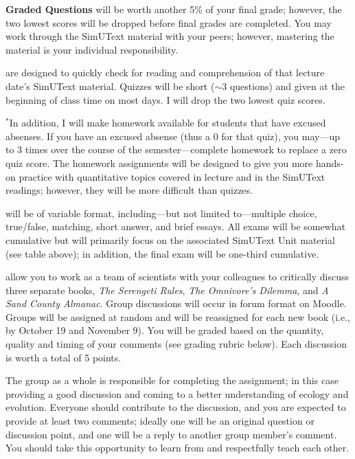\documentclass{tufte-handout}
\begin{document}
\textbf{Graded Questions} will be worth another 5\% of your final grade; however, the two lowest scores will be dropped before final grades are completed. You may work through the SimUText material with your peers; however, mastering the material is your individual responsibility.



\begin{fullwidth}	

 are designed to quickly check for reading and comprehension of that lecture date's SimUText material. Quizzes will be short ($\sim$3 questions) and given at the beginning of class time on most days. I will drop the two lowest quiz scores.

$^*$In addition, I will make homework available for students that have excused absenses. If you have an excused absense (thus a 0 for that quiz), you may---up to 3 times over the course of the semester---complete homework to replace a zero quiz score. The homework assignments will be designed to give you more hands-on practice with quantitative topics covered in lecture and in the SimUText readings; however, they will be more difficult than quizzes.
	
\newpage 

 will be of variable format, including---but not limited to---multiple choice, true/false, matching, short answer, and brief essays. All exams will be somewhat cumulative but will primarily focus on the associated SimUText Unit material (see table above); in addition, the final exam will be one-third cumulative. 
					
												
 allow you to work as a team of scientists with your colleagues to critically discuss three separate books, \emph{The Serengeti Rules}, \emph{The Omnivore's Dilemma}, and \emph{A Sand County Almanac}. Group discussions will occur in forum format on Moodle. Groups will be assigned at random and will be reassigned for each new book 
(i.e., by October 19 and November 9). 											%
You will be graded based on the quantity, quality and timing of your comments (see grading rubric below). Each discussion is worth a total of 5 points.

The group as a whole is responsible for completing the assignment; in this case providing a good discussion and coming to a better understanding of ecology and evolution. Everyone should contribute to the discussion, and you are expected to provide at least two comments; ideally one will be an original question or discussion point, and one will be a reply to another group member's comment. You should take this opportunity to learn from and respectfully teach each other.


\end{fullwidth}
\end{document}
